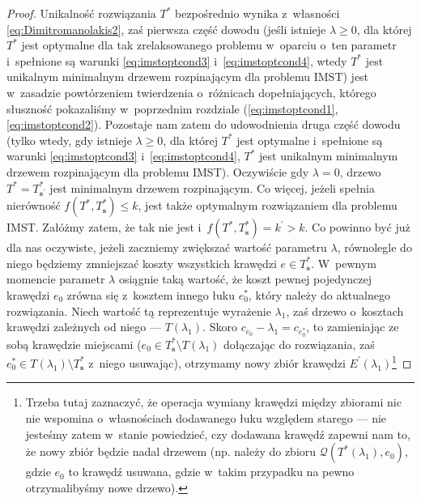 \begin{proof}
	Unikalność rozwiązania $T^{\ast}$ bezpośrednio wynika z~własności \ref{eq:Dimitromanolakis2}, zaś pierwsza część dowodu (jeśli istnieje $\lambda \geqslant 0$, dla której $T^{\ast}$ jest optymalne dla tak zrelaksowanego problemu w~oparciu o~ten parametr i~spełnione są warunki \ref{eq:imstoptcond3} i~\ref{eq:imstoptcond4}, wtedy $T^{\ast}$ jest unikalnym minimalnym drzewem rozpinającym dla problemu \textsc{IMST}) jest w~zasadzie powtórzeniem twierdzenia o~różnicach dopełniających, którego słuszność pokazaliśmy w~poprzednim rozdziale (\ref{eq:imstoptcond1}, \ref{eq:imstoptcond2}).
	Pozostaje nam zatem do udowodnienia druga część dowodu (tylko wtedy, gdy istnieje $\lambda \geqslant 0$, dla której $T^{\ast}$ jest optymalne i~spełnione są warunki \ref{eq:imstoptcond3} i~\ref{eq:imstoptcond4}, $T^{\ast}$ jest unikalnym minimalnym drzewem rozpinającym dla problemu \textsc{IMST}).
	Oczywiście gdy $\lambda = 0$, drzewo $T^{\ast} = T^{\ast}_{\textbf{s}^{\prime}}$ jest minimalnym drzewem rozpinającym.
	Co więcej, jeżeli spełnia nierówność $f \left( T^{\ast}, T^{\ast}_{\textbf{s}} \right) \leqslant k$, jest także optymalnym rozwiązaniem dla problemu \textsc{IMST}.
	Załóżmy zatem, że tak nie jest i~$f \left( T^{\ast}, T^{\ast}_{\textbf{s}} \right) = k^{\prime} > k$.
	Co powinno być już dla nas oczywiste, jeżeli zaczniemy zwiększać wartość parametru $\lambda$, równolegle do niego będziemy zmniejszać koszty wszystkich krawędzi $e \in T^{\ast}_{\textbf{s}}$.
	W~pewnym momencie parametr $\lambda$ osiągnie taką wartość, że koszt pewnej pojedynczej krawędzi $e_{0}$ zrówna się z~kosztem innego łuku $e_{0}^{\ast}$, który należy do aktualnego rozwiązania.
	Niech wartość tą reprezentuje wyrażenie $\lambda_{1}$, zaś drzewo o~kosztach krawędzi zależnych od niego --- $T \left( \lambda_{1} \right)$.
	Skoro $c_{e_{0}} - \lambda_{1} = c_{e_{0}^{\ast}}$, to zamieniając ze sobą krawędzie miejscami ($e_{0} \in T^{\ast}_{\textbf{s}} \setminus T \left( \lambda_{1} \right)$ dołączając do rozwiązania, zaś $e_{0}^{\ast} \in T \left( \lambda_{1} \right) \setminus T^{\ast}_{\textbf{s}}$ z~niego usuwając), otrzymamy nowy zbiór krawędzi $E^{\prime} \left( \lambda_{1} \right)$\footnote{
		Trzeba tutaj zaznaczyć, że operacja wymiany krawędzi między zbiorami nic nie wspomina o~własnościach dodawanego łuku względem starego --- nie jesteśmy zatem w~stanie powiedzieć, czy dodawana krawędź zapewni nam to, że nowy zbiór będzie nadal drzewem (np. należy do zbioru $\mathcal{Q} \left( T^{\ast} \left( \lambda_{1} \right), e_{0} \right)$, gdzie $e_{0}$ to krawędź usuwana, gdzie w~takim przypadku na pewno otrzymalibyśmy nowe drzewo).
}
\end{proof}
